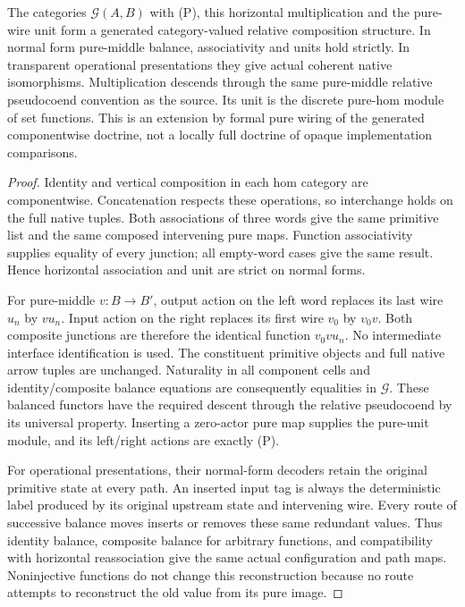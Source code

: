 \documentclass[11pt]{article}
\begin{document}
\begin{theorem}
The categories $\mathcal G(A,B)$ with (P), this horizontal multiplication and the pure-wire unit form a generated category-valued relative composition structure. In normal form pure-middle balance, associativity and units hold strictly. In transparent operational presentations they give actual coherent native isomorphisms. Multiplication descends through the same pure-middle relative pseudocoend convention as the source. Its unit is the discrete pure-hom module of set functions. This is an extension by formal pure wiring of the generated componentwise doctrine, not a locally full doctrine of opaque implementation comparisons.
\end{theorem}
\begin{proof}
Identity and vertical composition in each hom category are componentwise. Concatenation respects these operations, so interchange holds on the full native tuples. Both associations of three words give the same primitive list and the same composed intervening pure maps. Function associativity supplies equality of every junction; all empty-word cases give the same result. Hence horizontal association and unit are strict on normal forms.

For pure-middle $v:B\to B'$, output action on the left word replaces its last wire $u_n$ by $vu_n$. Input action on the right replaces its first wire $v_0$ by $v_0v$. Both composite junctions are therefore the identical function $v_0vu_n$. No intermediate interface identification is used. The constituent primitive objects and full native arrow tuples are unchanged. Naturality in all component cells and identity/composite balance equations are consequently equalities in $\mathcal G$. These balanced functors have the required descent through the relative pseudocoend by its universal property. Inserting a zero-actor pure map supplies the pure-unit module, and its left/right actions are exactly (P).

For operational presentations, their normal-form decoders retain the original primitive state at every path. An inserted input tag is always the deterministic label produced by its original upstream state and intervening wire. Every route of successive balance moves inserts or removes these same redundant values. Thus identity balance, composite balance for arbitrary functions, and compatibility with horizontal reassociation give the same actual configuration and path maps. Noninjective functions do not change this reconstruction because no route attempts to reconstruct the old value from its pure image.


\end{proof}
\end{document}
